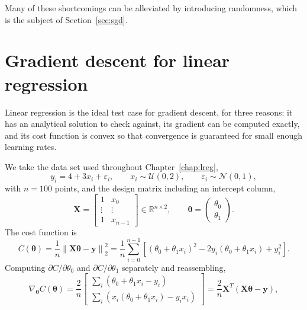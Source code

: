 Many of these shortcomings can be alleviated by introducing randomness, which
is the subject of Section~\ref{sec:sgd}.

\section{Gradient descent for linear regression}
\label{sec:gdlinreg}

Linear regression is the ideal test case for gradient descent, for three
reasons: it has an analytical solution to check against, its gradient can be
computed exactly, and its cost function is convex so that convergence is
guaranteed for small enough learning rates.

We take the data set used throughout Chapter~\ref{chap:lreg},
\begin{equation*}
  y_i = 4 + 3x_i + \varepsilon_i,
  \qquad x_i \sim \mathcal{U}(0,2),
  \qquad \varepsilon_i\sim\mathcal{N}(0,1),
\end{equation*}
with $n=100$ points, and the design matrix including an intercept column,
\begin{equation}
  \bm{X} = \begin{bmatrix}
    1 & x_0\\ \vdots & \vdots\\ 1 & x_{n-1}
  \end{bmatrix}
  \in\mathbb{R}^{n\times2},
  \qquad
  \bm{\theta}=\begin{pmatrix}\theta_0\\\theta_1\end{pmatrix}.
  \label{eq:4-gddesign}
\end{equation}
The cost function is
\begin{equation}
  C(\bm{\theta}) = \frac{1}{n}\left\|\bm{X}\bm{\theta}-\bm{y}\right\|_2^{2}
   = \frac{1}{n}\sum_{i=0}^{n-1}
     \left[(\theta_0+\theta_1 x_i)^{2}
       -2y_i(\theta_0+\theta_1x_i)+y_i^{2}\right].
  \label{eq:4-gdcost}
\end{equation}
Computing $\partial C/\partial\theta_0$ and $\partial C/\partial\theta_1$
separately and reassembling,
\begin{equation}
  \nabla_{\bm{\theta}}C(\bm{\theta})
   = \frac{2}{n}\begin{bmatrix}
       \sum_i\left(\theta_0+\theta_1x_i-y_i\right)\\
       \sum_i\left(x_i(\theta_0+\theta_1x_i)-y_ix_i\right)
     \end{bmatrix}
   = \frac{2}{n}\bm{X}^{T}\left(\bm{X}\bm{\theta}-\bm{y}\right),
  \label{eq:4-gdgradient}
\end{equation}
